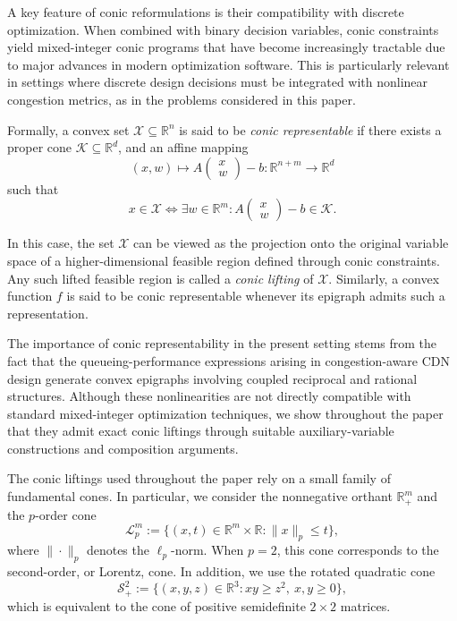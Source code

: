 \documentclass[a4paper,11pt,reqno]{amsart}
\begin{document}
A key feature of conic reformulations is their compatibility with discrete optimization. When combined with binary decision variables, conic constraints yield mixed-integer conic programs that have become increasingly tractable due to major advances in modern optimization software. This is particularly relevant in settings where discrete design decisions must be integrated with nonlinear congestion metrics, as in the problems considered in this paper.

Formally, a convex set $\mathcal{X} \subseteq \mathbb{R}^n$ is said to be \emph{conic representable} if there exists a proper cone $\mathcal{K} \subseteq \mathbb{R}^d$, and an affine mapping
$$
(x,w)\mapsto
A
\begin{pmatrix}
x\\
w
\end{pmatrix}
-b
:
\mathbb{R}^{n+m}\to\mathbb{R}^d
$$
such that
$$
x \in \mathcal{X}
\iff
\exists w \in \mathbb{R}^m :
A
\begin{pmatrix}
x\\
w
\end{pmatrix}
-b
\in \mathcal{K}.
$$

In this case, the set $\mathcal{X}$ can be viewed as the projection onto the original variable space of a higher-dimensional feasible region defined through conic constraints. Any such lifted feasible region is called a \emph{conic lifting} of $\mathcal{X}$. Similarly, a convex function $f$ is said to be conic representable whenever its epigraph admits such a representation.

The importance of conic representability in the present setting stems from the fact that the queueing-performance expressions arising in congestion-aware CDN design generate convex epigraphs involving coupled reciprocal and rational structures. Although these nonlinearities are not directly compatible with standard mixed-integer optimization techniques, we show throughout the paper that they admit exact conic liftings through suitable auxiliary-variable constructions and composition arguments.

The conic liftings used throughout the paper rely on a small family of fundamental cones. In particular, we consider the nonnegative orthant $\mathbb{R}^m_+$ and the $p$-order cone
$$
\mathcal{L}^m_p :=
\{
(x,t)\in\mathbb{R}^m\times\mathbb{R}
:
\|x\|_p \le t
\},
$$
where $\|\cdot\|_p$ denotes the $\ell_p$-norm. When $p=2$, this cone corresponds to the second-order, or Lorentz, cone. In addition, we use the rotated quadratic cone
$$
\mathcal{S}^2_+ :=
\{
(x,y,z)\in\mathbb{R}^3
:
xy\ge z^2,\ x,y\ge0
\},
$$
which is equivalent to the cone of positive semidefinite $2\times2$ matrices.
\end{document}
